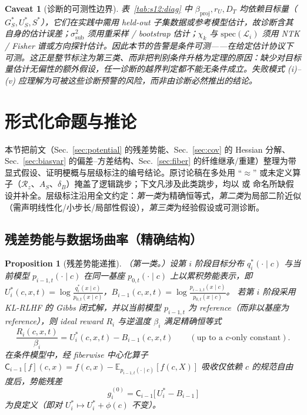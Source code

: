 \documentclass[11pt,a4paper]{article}
\newtheorem{proposition}[theorem]{Proposition}
\newtheorem{caveat}[theorem]{Caveat}
\newcommand{\E}{\mathbb{E}}
\newcommand{\cL}{\mathcal{L}}   %
\newcommand{\Rstr}{\mathcal{R}}     %
\newcommand{\Center}{\mathsf{C}}    %
\begin{document}
\begin{caveat}[诊断的可测性边界]\label{cav:s12:measurability}
表~\ref{tab:s12:diag} 中 $\beta_{\mathrm{proj}},r_U,D_T$ 均依赖目标量（$G_S^*,U_S^*,S^*$），它们在实践中需用 held-out 子集数据或参考模型估计，故诊断含其自身的估计误差；$\sigma_{\mathrm{sub}}^2$ 须用重采样 / bootstrap 估计；$\chi_k$ 与 $\mathrm{spec}(\cL_i)$ 须用 NTK / Fisher 谱或方向探针估计。因此本节的告警是\emph{条件可测}——在给定估计协议下可测。这正是整节标注为第三类、而非把判别条件升格为定理的原因：缺少对目标量估计无偏性的额外假设，任一诊断的越界判定都不能无条件成立。失败模式 (i)--(v) 应理解为可被这些诊断\emph{预警}的风险，而非由诊断必然推出的结论。
\end{caveat}

\section{形式化命题与推论}\label{sec:propositions}

本节把前文（Sec.~\ref{sec:potential} 的残差势能、Sec.~\ref{sec:cov} 的 Hessian 分解、Sec.~\ref{sec:biasvar} 的偏差--方差结构、Sec.~\ref{sec:fiber} 的纤维继承/重建）整理为带显式假设、证明梗概与层级标注的编号结论。原讨论稿在多处用 ``$\approx$'' 或未定义算子（$\Rstr_z$、$A_S$、$\delta_B$）掩盖了逻辑跳步；下文凡涉及此类跳步，均以 \caveat 或 \remark 命名所缺假设并补全。层级标注沿用全文约定：\emph{第一类}为精确恒等式，\emph{第二类}为局部二阶近似（需声明线性化/小步长/局部性假设），\emph{第三类}为经验假设或可测诊断。

\subsection{残差势能与数据场曲率（精确结构）}

\begin{proposition}[残差势能递推]\label{prop:s13:residual}
（第一类。）设第 $i$ 阶段目标分布 $q_i^*(\cdot\mid c)$ 与当前模型 $p_{i-1,t}(\cdot\mid c)$ 在同一基座 $p_{0,t}(\cdot\mid c)$ 上以累积势能表示，即
$U_i^*(c,x,t)=\log\frac{q_i^*(x\mid c)}{p_{0,t}(x\mid c)}$，$B_{i-1}(c,x,t)=\log\frac{p_{i-1,t}(x\mid c)}{p_{0,t}(x\mid c)}$。
若第 $i$ 阶段采用 KL-RLHF 的 Gibbs 闭式解，并\emph{以当前模型 $p_{i-1,t}$ 为 reference}（而非以基座为 reference），则 ideal reward $R_i$ 与逆温度 $\beta_i$ 满足精确恒等式
\begin{equation}\label{eq:s13:reward}
\frac{R_i(c,x,t)}{\beta_i}=U_i^*(c,x,t)-B_{i-1}(c,x,t)\qquad(\text{up to a }c\text{-only constant}).
\end{equation}
在条件模型中，经 fiberwise 中心化算子 $\Center_{i-1}[f](c,x)=f(c,x)-\E_{p_{i-1,t}(\cdot\mid c)}[f(c,X)]$ 吸收仅依赖 $c$ 的规范自由度后，势能残差
\begin{equation}\label{eq:s13:g0}
\boxed{\,g_i^{(0)}=\Center_{i-1}\!\big[\,U_i^*-B_{i-1}\,\big]\,}
\end{equation}
为良定义（即对 $U_i^*\mapsto U_i^*+\phi(c)$ 不变）。
\end{proposition}
\end{document}

